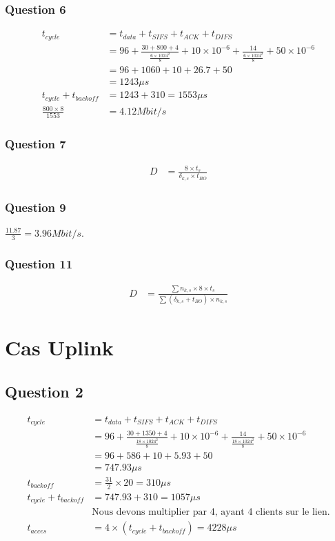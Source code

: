\subsubsection{Question 6}
\begin{align*}
t_{cycle} &= t_{data} + t_{SIFS} + t_{ACK} + t_{DIFS}\\
          &= 96 + \frac{30 + 800 + 4}{\frac{6 \times 1024^2}{8}}
            + 10 \times 10^{-6} + \frac{14}{\frac{6 \times 1024^2}{8}}
            + 50 \times 10^{-6}\\
          &= 96 + 1060 + 10 + 26.7 + 50\\
          &= 1243 \mu s\\
t_{cycle} + t_{backoff} &= 1243 + 310 = 1553 \mu s\\
\frac{800 \times 8}{1553} &= 4.12 Mbit/s
\end{align*}

\subsubsection{Question 7}
\begin{align*}
D &= \frac{8 \times t_s}{\delta_{k,s} \times t_{BO}}
\end{align*}

\subsubsection{Question 9}
$\frac{11.87}{3} = 3.96 Mbit/s$.

\subsubsection{Question 11}
\begin{align*}
D &= \frac{\displaystyle\sum n_{k,s} \times 8 \times t_s}
    {\displaystyle\sum (\delta_{k,s} + t_{BO}) \times n_{k,s}}
\end{align*}

\section{Cas Uplink}
\subsection{Question 2}
\begin{align*}
t_{cycle} &= t_{data} + t_{SIFS} + t_{ACK} + t_{DIFS}\\
          &= 96 + \frac{30 + 1350 + 4}{\frac{18 \times 1024^2}{8}}
            + 10 \times 10^{-6} + \frac{14}{\frac{18 \times 1024^2}{8}}
            + 50 \times 10^{-6}\\
          &= 96 + 586 + 10 + 5.93 + 50\\
          &= 747.93 \mu s\\
t_{backoff} &= \frac{31}{2} \times 20 = 310 \mu s\\
t_{cycle} + t_{backoff} &= 747.93 + 310 = 1057 \mu s\\
&\text{Nous devons multiplier par 4, ayant 4 clients sur le lien.}\\
t_{acces} &= 4 \times (t_{cycle} + t_{backoff}) = 4228 \mu s
\end{align*}

